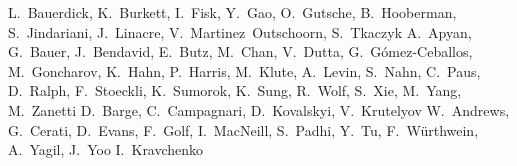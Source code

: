 \begin{Authlist}
%
L.~Bauerdick, K.~Burkett, I.~Fisk, Y.~Gao, O.~Gutsche, B.~Hooberman, S.~Jindariani, J.~Linacre, V.~Martinez~Outschoorn, S.~Tkaczyk
%
A.~Apyan, G.~Bauer, J.~Bendavid, E.~Butz, M.~Chan, V.~Dutta, G.~G\'omez-Ceballos, M.~Goncharov, K.~Hahn, P.~Harris, M.~Klute, A.~Levin, S.~Nahn, C.~Paus, D.~Ralph, F.~Stoeckli, K.~Sumorok, K.~Sung, R.~Wolf, S.~Xie, M.~Yang, M.~Zanetti
%
D.~Barge, C.~Campagnari, D.~Kovalskyi, V.~Krutelyov
%
W.~Andrews, G.~Cerati, D.~Evans, F.~Golf, I.~MacNeill, S.~Padhi, Y.~Tu, F.~W\"urthwein, A.~Yagil, J.~Yoo
%
I.~Kravchenko

\end{Authlist}
